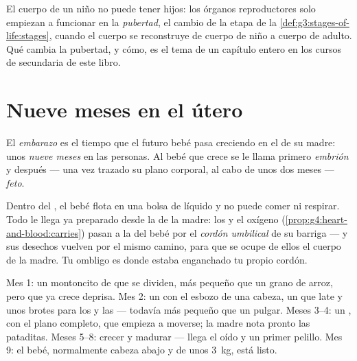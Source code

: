 \begin{remark}\label{rem:g5:human-reproduction:adults}
El cuerpo de un niño no puede tener hijos: los órganos reproductores
solo empiezan a funcionar en la \emph{pubertad}, el cambio de la etapa
 de la \cref{def:g3:stages-of-life:stages}, cuando el
cuerpo se reconstruye de cuerpo de niño a cuerpo de adulto. Qué cambia
la pubertad, y cómo, es el tema de un capítulo entero en los cursos de
secundaria de este libro.
\end{remark}

\section{Nueve meses en el útero}

\begin{definition}[Embarazo]\label{def:g5:human-reproduction:pregnancy}
El \emph{embarazo} es el tiempo que el futuro bebé
pasa creciendo en el  de su madre: unos \emph{nueve meses} en las
personas. Al bebé que crece se le llama primero
\emph{embrión} y después --- una vez trazado su plano
corporal, al cabo de unos dos meses --- \emph{feto}.
\end{definition}

\begin{proposition}\label{prop:g5:human-reproduction:cord}
Dentro del , el bebé flota en una bolsa de líquido y no puede
comer ni respirar. Todo le llega ya preparado desde la  de la
madre: los  y el oxígeno
(\cref{prop:g4:heart-and-blood:carries}) pasan a la  del bebé
por el \emph{cordón umbilical} de su barriga
--- y sus desechos vuelven por el mismo camino, para que se ocupe de
ellos el cuerpo de la madre. Tu ombligo es donde estaba enganchado tu
propio cordón.
\end{proposition}
\admitted

\begin{example}\label{ex:g5:human-reproduction:timetable}
Mes 1: un montoncito de  que se dividen, más pequeño que un
grano de arroz, pero que ya crece deprisa. Mes 2: un  con el
esbozo de una cabeza, un  que late y unos brotes para los
 y las  --- todavía más pequeño que un pulgar. Meses
3--4: un , con el plano completo, que empieza a moverse; la madre
nota pronto las pataditas. Meses 5--8: crecer y madurar --- llega el
oído y un primer pelillo. Mes 9: el bebé, normalmente cabeza abajo y
de unos \qty{3}{kg}, está listo.
\end{example}

